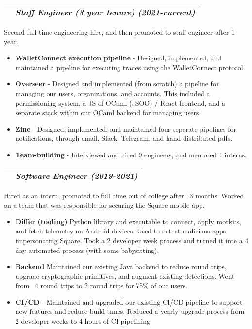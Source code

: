 \documentclass[letterpaper,10pt]{article}
\makeatletter
\newcommand{\sectiontitle}[2]{%
  \begin{tabularx}{\linewidth}{@{} X c @{}}
    {\sffamily\textbf{#1}} & {\rmfamily\textit{#2}} \\ \hline
  \end{tabularx}%
  \vspace{3pt}%
}
\newcommand{\inlineimg}[2][width=0.4cm]{%
  \begin{adjustbox}{raise=-0.2\height}%
    \texttt{[image: \#2]}%
  \end{adjustbox}%
}
\makeatother
\begin{document}
\newlength{\firstcolwidth}
\newlength{\secondcolwidth}
\setlength{\firstcolwidth}{\dimexpr(2\textwidth - 3\columnsep)/3\relax}
\setlength{\secondcolwidth}{\dimexpr(\textwidth - \columnsep)/3\relax}

\setlength{\arrayrulewidth}{0.1pt}

\begin{minipage}[t]{\firstcolwidth}
  \sectiontitle{\inlineimg[width=11pt]{assets/skolem.png} Skolem Technologies}{Staff Engineer (3 year tenure) (2021-current)}
  Second full-time engineering hire, and then promoted to staff engineer after 1 year.
  \begin{itemize}[leftmargin=*,itemsep=2pt,topsep=0pt]
    \item \textbf{WalletConnect execution pipeline} - Designed, implemented, and maintained a pipeline for executing trades using the WalletConnect protocol.
    \item \textbf{Overseer} - Designed and implemented (from scratch) a pipeline for managing our users, organizations, and accounts. This included a permissioning system, a JS of OCaml (JSOO) / React frontend, and a separate stack within our OCaml backend for managing users.
    \item \textbf{Zine} - Designed, implemented, and maintained four separate pipelines for notifications, through email, Slack, Telegram, and hand-distributed pdfs.
    \item \textbf{Team-building} - Interviewed and hired 9 engineers, and mentored 4 interns.
  \end{itemize}


  \vspace{3pt}
  \sectiontitle{\inlineimg[width=11pt]{assets/square.png} Square Inc. [Mobile Security]}{Software Engineer (2019-2021)}
  Hired as an intern, promoted to full time out of college after ~3 months.
  Worked on a team that was responsible for securing the Square mobile app.
  \begin{itemize}[leftmargin=*,itemsep=2pt,topsep=0pt]
    \item \textbf{Differ (tooling)} Python library and executable to connect, apply rootkits, and fetch telemetry on Android devices. Used to detect malicious apps impersonating Square. Took a 2 developer week process and turned it into a 4 day automated process (with some babysitting).
    \item \textbf{Backend} Maintained our existing Java backend to reduce round trips, upgrade cryptographic primitives, and augment existing detections. Went from ~4 round trips to 2 round trips for 75\% of our users.
    \item \textbf{CI/CD} - Maintained and upgraded our existing CI/CD pipeline to support new features and reduce build times. Reduced a yearly upgrade process from 2 developer weeks to 4 hours of CI pipelining.
  \end{itemize}


\end{minipage}
\end{document}
